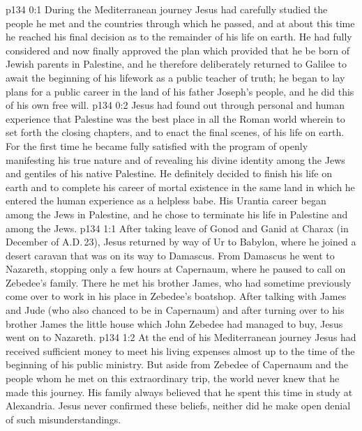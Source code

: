 \author{Midwayer Commission}
\vs p134 0:1 During the Mediterranean journey Jesus had carefully studied the people he met and the countries through which he passed, and at about this time he reached his final decision as to the remainder of his life on earth. He had fully considered and now finally approved the plan which provided that he be born of Jewish parents in Palestine, and he therefore deliberately returned to Galilee to await the beginning of his lifework as a public teacher of truth; he began to lay plans for a public career in the land of his father Joseph’s people, and he did this of his own free will.
\vs p134 0:2 Jesus had found out through personal and human experience that Palestine was the best place in all the Roman world wherein to set forth the closing chapters, and to enact the final scenes, of his life on earth. For the first time he became fully satisfied with the program of openly manifesting his true nature and of revealing his divine identity among the Jews and gentiles of his native Palestine. He definitely decided to finish his life on earth and to complete his career of mortal existence in the same land in which he entered the human experience as a helpless babe. His Urantia career began among the Jews in Palestine, and he chose to terminate his life in Palestine and among the Jews.
\vs p134 1:1 After taking leave of Gonod and Ganid at Charax (in December of A.D.\,23), Jesus returned by way of Ur to Babylon, where he joined a desert caravan that was on its way to Damascus. From Damascus he went to Nazareth, stopping only a few hours at Capernaum, where he paused to call on Zebedee’s family. There he met his brother James, who had sometime previously come over to work in his place in Zebedee’s boatshop. After talking with James and Jude (who also chanced to be in Capernaum) and after turning over to his brother James the little house which John Zebedee had managed to buy, Jesus went on to Nazareth.
\vs p134 1:2 At the end of his Mediterranean journey Jesus had received sufficient money to meet his living expenses almost up to the time of the beginning of his public ministry. But aside from Zebedee of Capernaum and the people whom he met on this extraordinary trip, the world never knew that he made this journey. His family always believed that he spent this time in study at Alexandria. Jesus never confirmed these beliefs, neither did he make open denial of such misunderstandings.
